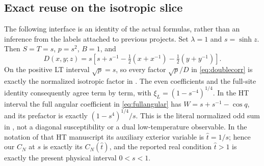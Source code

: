 \documentclass[11pt]{article}
\numberwithin{equation}{section}
\theoremstyle{definition}
\begin{document}
\subsection{Exact reuse on the isotropic slice}
The following interface is an identity of the actual formulas, rather
than an inference from the labels attached to previous projects. Set
$\lambda=1$ and $s=\sinh z$. Then $S=T=s$, $p=s^2$, $B=1$, and
\[
 D(x,y;z)=s\left[s+s^{-1}
                  -\tfrac12(x+x^{-1})-\tfrac12(y+y^{-1})\right].
\]
On the positive LT interval $\sqrt p=s$, so every factor
$\sqrt p/D$ in \eqref{eq:doublecorr} is exactly the normalized
isotropic factor in \cite{LTsource}. The even coefficients and the
full-site identity consequently agree term by term, with
$\xi_L=(1-s^{-4})^{1/4}$. In the HT interval the full angular coefficient
in \eqref{eq:fullangular} has $W=s+s^{-1}-\cos q$, and its prefactor
is exactly $(1-s^4)^{1/4}/s$. This is the literal normalized odd sum
in \cite{HTsource}, not a diagonal susceptibility or a dual
low-temperature observable.
In the notation of that HT manuscript its auxiliary exterior variable
is $\widehat t=1/s$; hence our $C_N$ at $s$ is exactly its
$C_N(\widehat t)$, and the reported real condition $\widehat t>1$
is exactly the present physical interval $0<s<1$.
\end{document}
